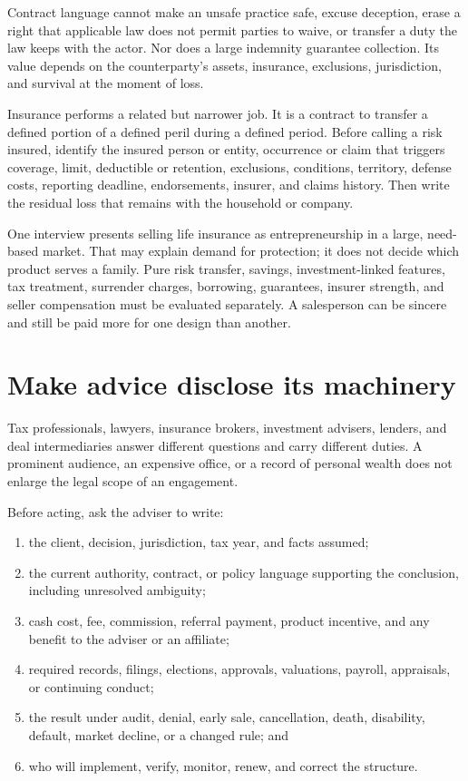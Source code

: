 Contract language cannot make an unsafe practice safe, excuse deception, erase
a right that applicable law does not permit parties to waive, or transfer a
duty the law keeps with the actor. Nor does a large indemnity guarantee
collection. Its value depends on the counterparty's assets, insurance,
exclusions, jurisdiction, and survival at the moment of loss.

Insurance performs a related but narrower job. It is a contract to transfer a
defined portion of a defined peril during a defined period. Before calling a
risk insured, identify the insured person or entity, occurrence or claim that
triggers coverage, limit, deductible or retention, exclusions, conditions,
territory, defense costs, reporting deadline, endorsements, insurer, and
claims history. Then write the residual loss that remains with the household
or company.

One interview presents selling life insurance as entrepreneurship in a large,
need-based market. That may explain demand for protection; it does not decide
which product serves a family. Pure risk transfer, savings, investment-linked
features, tax treatment, surrender charges, borrowing, guarantees, insurer
strength, and seller compensation must be evaluated separately. A salesperson
can be sincere and still be paid more for one design than another.

\section{Make advice disclose its machinery}

Tax professionals, lawyers, insurance brokers, investment advisers, lenders,
and deal intermediaries answer different questions and carry different duties.
A prominent audience, an expensive office, or a record of personal wealth
does not enlarge the legal scope of an engagement.

Before acting, ask the adviser to write:

\begin{enumerate}[itemsep=0.13em]
\item the client, decision, jurisdiction, tax year, and facts assumed;
\item the current authority, contract, or policy language supporting the
  conclusion, including unresolved ambiguity;
\item cash cost, fee, commission, referral payment, product incentive, and any
  benefit to the adviser or an affiliate;
\item required records, filings, elections, approvals, valuations, payroll,
  appraisals, or continuing conduct;
\item the result under audit, denial, early sale, cancellation, death,
  disability, default, market decline, or a changed rule; and
\item who will implement, verify, monitor, renew, and correct the structure.
\end{enumerate}

